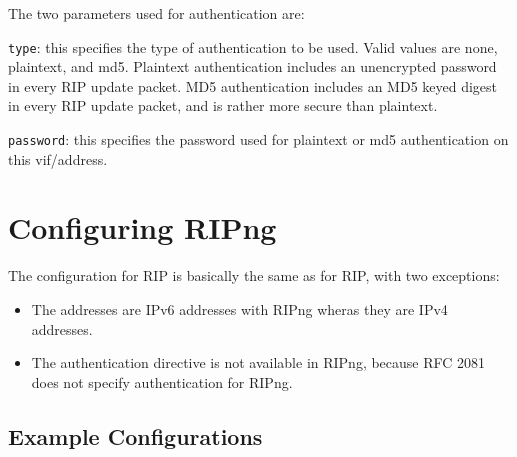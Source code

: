 \begin{description}
\begin{description}
The two parameters used for authentication are:
\begin{description}
\item{\tt type}: this specifies the type of authentication to be used.
  Valid values are {\stt none}, {\stt plaintext}, and {\stt md5}.
  Plaintext authentication includes an unencrypted password in every
  RIP update packet.  MD5 authentication includes an MD5 keyed digest
  in every RIP update packet, and is rather more secure than
  plaintext.
\item{\tt password}: this specifies the password used for plaintext or
  md5 authentication on this vif/address.
\end{description}
\end{description}
\end{description}

\section{Configuring RIPng}

The configuration for RIP is basically the same as for RIP, with two
exceptions:
\begin{itemize}
\item The addresses are IPv6 addresses with RIPng wheras they are IPv4
  addresses.
\item The {\stt authentication} directive is not available in RIPng,
  because RFC 2081 does not specify authentication for RIPng.
\end{itemize}

\subsection{Example Configurations}


